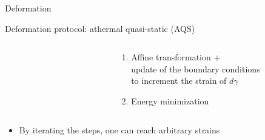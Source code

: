 \documentclass[compress]{beamer}
\begin{document}
	\begin{frame}{Deformation}
		
		\begin{block}{Deformation protocol: athermal quasi-static (AQS)}
		
			\begin{columns}[T]
				
				\begin{column}{0.3\textwidth}
					\begin{figure}
						\centering
					\end{figure}
				\end{column}
			
				\begin{column}{0.7\textwidth}
				
					\vspace{0.5cm}
					
					\begin{enumerate}
						\item<2-> Affine transformation + \\ update of the boundary conditions \\ to increment the strain of $d\gamma$
						\item<3-> Energy minimization
					\end{enumerate}
				\end{column}
				
			\end{columns}
			
			\vspace{0.5cm}
			
			\begin{itemize}
				\item<4-> By iterating the steps, one can reach arbitrary strains
			\end{itemize}
			
		\end{block}
		
	\end{frame}
\end{document}
